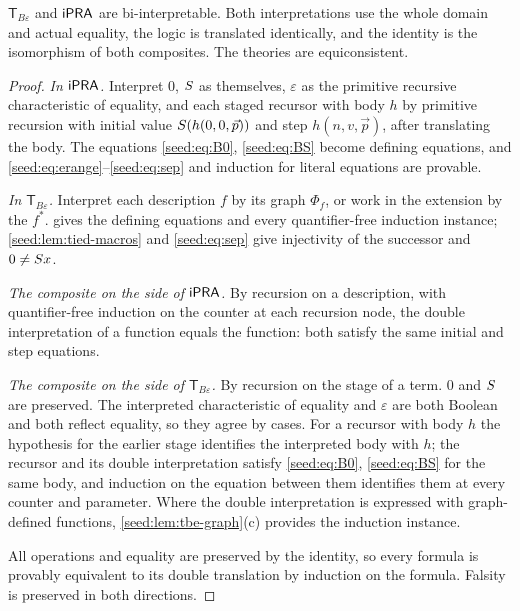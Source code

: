 \begin{theorem}[Bi-interpretation]\label{seed:thm:tied-biint}
$\mathsf{T}_{B\varepsilon}$ and $\mathsf{iPRA}$ are bi-interpretable. Both
interpretations use the whole domain and actual equality, the logic is
translated identically, and the identity is the isomorphism of both
composites. The theories are equiconsistent.
\end{theorem}

\begin{proof}
\emph{In $\mathsf{iPRA}$.} Interpret $0$, $S$ as themselves, $\varepsilon$ as the
primitive recursive characteristic of equality, and each staged recursor
with body $h$ by primitive recursion with initial value
$S(h(0,0,\vec p))$ and step $h(n,v,\vec p)$, after translating the body.
The equations \eqref{seed:eq:B0}, \eqref{seed:eq:BS} become defining
equations, and \eqref{seed:eq:erange}--\eqref{seed:eq:sep} and induction for
literal equations are provable.

\emph{In $\mathsf{T}_{B\varepsilon}$.} Interpret each description $f$ by
its graph $\Phi_f$, or work in the extension by the $f^*$.
 gives the defining equations and every
quantifier-free induction instance; \cref{seed:lem:tied-macros} and
\eqref{seed:eq:sep} give injectivity of the successor and
$0\neq S x$.

\emph{The composite on the side of $\mathsf{iPRA}$.} By recursion on a description,
with quantifier-free induction on the counter at each recursion node, the
double interpretation of a function equals the function: both satisfy the
same initial and step equations.

\emph{The composite on the side of $\mathsf{T}_{B\varepsilon}$.} By
recursion on the stage of a term. $0$ and $S$ are preserved. The
interpreted characteristic of equality and $\varepsilon$ are both Boolean
and both reflect equality, so they agree by cases. For a recursor with body
$h$ the hypothesis for the earlier stage identifies the interpreted body
with $h$; the recursor and its double interpretation satisfy
\eqref{seed:eq:B0}, \eqref{seed:eq:BS} for the same body, and induction on
the equation between them identifies them at every counter and parameter.
Where the double interpretation is expressed with graph-defined functions,
\cref{seed:lem:tbe-graph}(c) provides the induction instance.

All operations and equality are preserved by the identity, so every formula
is provably equivalent to its double translation by induction on the
formula. Falsity is preserved in both directions.
\end{proof}

